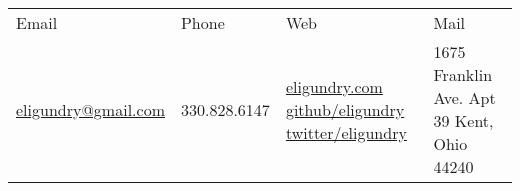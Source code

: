 \begin{tabu} to \linewidth {X X X X}
	\rowfont{\smaller\bfseries}
	Email & Phone & Web & Mail \\
	\rowfont{\smaller}
	\href{mailto:eligundry@gmail.com}{eligundry@gmail.com} &
	330.828.6147 &
	\href{https://eligundry.com}{eligundry.com} \newline
	\href{https://github.com/eligundry}{github/eligundry} \newline
	\href{https://twitter.com/EliGundry}{twitter/eligundry} &
	1675 Franklin Ave.\newline
	Apt 39\newline
	Kent, Ohio 44240 \\
\end{tabu}

